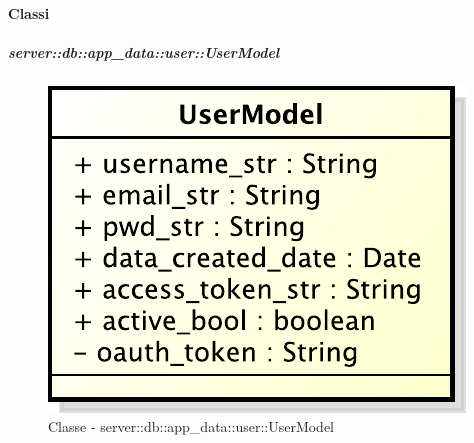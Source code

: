 	\paragraph{Classi} %

		\subparagraph{server::db::app\_data::user::UserModel} %
		\label{subp:server_db_app_data_user_user_model}
			\begin{figure}[htbp]
				\centering
				\centerline{\includegraphics[scale=0.75]{./images/server/classes/db/user_model.pdf}}
				\caption{Classe - server::db::app\_data::user::UserModel}
			\end{figure}
